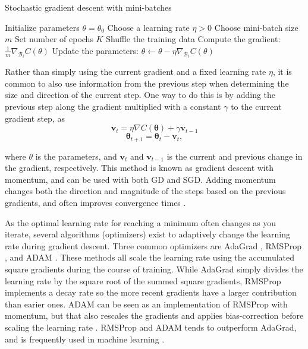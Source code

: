 \begin{algorithm}
\caption{Stochastic gradient descent with mini-batches}\label{alg:sgd}
\begin{algorithmic}[1]
    \STATE Initialize parameters $\theta = \theta_0$
    \STATE Choose a learning rate $\eta > 0$
    \STATE Choose mini-batch size $m$
    \STATE Set number of epochs $K$
        \STATE Shuffle the training data
            \STATE Compute the gradient: $\frac{1}{m}\nabla_{\mathcal{B}_i} C(\theta)$
            \STATE Update the parameters: $\theta \leftarrow \theta - \eta \nabla_{\mathcal{B}_i} C(\theta)$
        \ENDFOR
    \ENDFOR
\end{algorithmic}
\end{algorithm}

Rather than simply using the current gradient and a fixed learning rate $\eta$, it is common to also use information from the previous step when determining the size and direction of the current step. One way to do this is by adding the previous step along the gradient multiplied with a constant $\gamma$ to the current gradient step, as
\begin{equation}
    \mathbf{v}_{t} = \eta \nabla C(\boldsymbol{\theta}) + \gamma \mathbf{v}_{t-1}
\end{equation}
\begin{equation}
    \boldsymbol{\theta}_{t+1}= \boldsymbol{\theta}_t -\mathbf{v}_{t},
\end{equation}
    
where $\theta$ is the parameters, and $\mathbf{v}_t$ and $\mathbf{v}_{t-1}$ is the current and previous change in the gradient, respectively. This method is known as gradient descent with momentum, and can be used with both GD and SGD. Adding momentum changes both the direction and magnitude of the steps based on the previous gradients, and often improves convergence times \cite{Goodfellow:2016:deep_learning}.

As the optimal learning rate for reaching a minimum often changes as you iterate, several algorithms (optimizers) exist to adaptively change the learning rate during gradient descent. Three common optimizers are AdaGrad \cite{duchi2011:adagrad}, RMSProp \cite{hinton2012:rmsprop}, and ADAM \cite{kingma2017:adam}. These methods all scale the learning rate using the accumulated square gradients during the course of training. While AdaGrad simply divides the learning rate by the square root of the summed square gradients, RMSProp implements a decay rate so the more recent gradients have a larger contribution than earier ones. ADAM can be seen as an implementation of RMSProp with momentum, but that also rescales the gradients and applies bias-correction before scaling the learning rate \cite{Goodfellow:2016:deep_learning}. RMSProp and ADAM tends to outperform AdaGrad, and is frequently used in machine learning \cite{Goodfellow:2016:deep_learning}.




